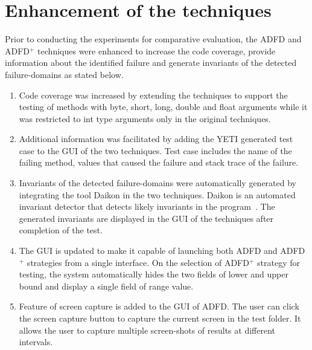 \section{Enhancement of the techniques}
Prior to conducting the experiments for comparative evaluation, the ADFD and ADFD$^+$ techniques were enhanced to increase the code coverage, provide information about the identified failure and generate invariants of the detected failure-domains as stated below. 
\begin{enumerate}

\item Code coverage was increased by extending the techniques to support the testing of methods with byte, short, long, double and float arguments while it was restricted to int type arguments only in the original techniques.

\item Additional information was facilitated by adding the YETI generated test case to the GUI of the two techniques. Test case includes the name of the failing method, values that caused the failure and stack trace of the failure.

\item Invariants of the detected failure-domains were automatically generated by integrating the tool Daikon in the two techniques. Daikon is an automated invariant detector that detects likely invariants in the program~\cite{ernst2007daikon}. The generated invariants are displayed in the GUI of the techniques after completion of the test. 

\item The GUI is updated to make it capable of launching both ADFD and ADFD$^+$ strategies from a single interface. On the selection of ADFD$^+$ strategy for testing, the system automatically hides the two fields of lower and upper bound and display a single field of range value. 

\item Feature of screen capture is added to the GUI of ADFD. The user can click the screen capture button to capture the current screen in the test folder. It allows the user to capture multiple screen-shots of results at different intervals. 

\end{enumerate}

